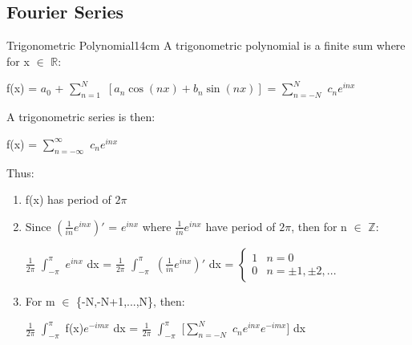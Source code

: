     \newpage





\subsection{ Fourier Series }

    \begin{definition}{Trigonometric Polynomial}{14cm}
        A trigonometric polynomial is a finite sum where for x $\in$ $\mathbb{R}$:
        
        \hspace{0.5cm}
        f(x) = $a_0$ + $\sum_{n=1}^N$ $[a_n \cos(nx) + b_n \sin(nx)]$
        = $\sum_{n=-N}^N$ $c_n e^{inx}$

        A trigonometric series is then:

        \hspace{0.5cm}
        f(x) = $\sum_{n=-\infty}^{\infty}$ $c_n e^{inx}$

        Thus:

        \begin{enumerate}[label=(\alph*), leftmargin=1.5cm, itemsep=0.1cm]
            \item f(x) has period of $2\pi$
            
            \item Since $(\frac{1}{in}e^{inx})'$ = $e^{inx}$ where
                $\frac{1}{in}e^{inx}$ have period of $2\pi$, then
                for n $\in$ $\mathbb{Z}$:

                \hspace{0.5cm}
                $\frac{1}{2\pi}$ $\int_{-\pi}^{\pi}$ $e^{inx}$ dx
                = $\frac{1}{2\pi}$ $\int_{-\pi}^{\pi}$ $(\frac{1}{in}e^{inx})'$ dx
                = $\begin{cases}
                    1 & n = 0 \\
                    0 & n = \pm 1, \pm 2, ...
                    \end{cases}$

            \item For m $\in$ \{-N,-N+1,...,N\}, then:
            
                \hspace{0.5cm}
                $\frac{1}{2\pi}$ $\int_{-\pi}^{\pi}$ f(x)$e^{-imx}$ dx
                = $\frac{1}{2\pi}$ $\int_{-\pi}^{\pi}$
                    [$\sum_{n=-N}^N$ $c_n e^{inx}e^{-imx}$] dx
                

\end{enumerate}
\end{definition}
